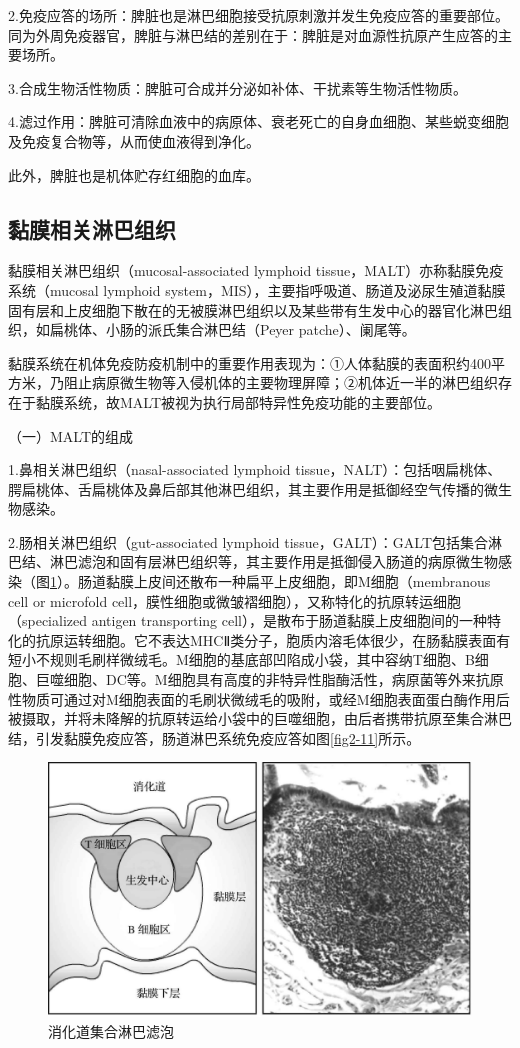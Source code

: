 2.免疫应答的场所：脾脏也是淋巴细胞接受抗原刺激并发生免疫应答的重要部位。同为外周免疫器官，脾脏与淋巴结的差别在于：脾脏是对血源性抗原产生应答的主要场所。

3.合成生物活性物质：脾脏可合成并分泌如补体、干扰素等生物活性物质。

4.滤过作用：脾脏可清除血液中的病原体、衰老死亡的自身血细胞、某些蜕变细胞及免疫复合物等，从而使血液得到净化。

此外，脾脏也是机体贮存红细胞的血库。


\subsection{黏膜相关淋巴组织}

黏膜相关淋巴组织（mucosal-associated lymphoid
tissue，MALT）亦称黏膜免疫系统（mucosal lymphoid
system，MIS），主要指呼吸道、肠道及泌尿生殖道黏膜固有层和上皮细胞下散在的无被膜淋巴组织以及某些带有生发中心的器官化淋巴组织，如扁桃体、小肠的派氏集合淋巴结（Peyer
patche）、阑尾等。

黏膜系统在机体免疫防疫机制中的重要作用表现为：①人体黏膜的表面积约400平方米，乃阻止病原微生物等入侵机体的主要物理屏障；②机体近一半的淋巴组织存在于黏膜系统，故MALT被视为执行局部特异性免疫功能的主要部位。

（一）MALT的组成

1.鼻相关淋巴组织（nasal-associated lymphoid
tissue，NALT）：包括咽扁桃体、腭扁桃体、舌扁桃体及鼻后部其他淋巴组织，其主要作用是抵御经空气传播的微生物感染。

2.肠相关淋巴组织（gut-associated lymphoid
tissue，GALT）：GALT包括集合淋巴结、淋巴滤泡和固有层淋巴组织等，其主要作用是抵御侵入肠道的病原微生物感染（图\ref{fig2-10}）。肠道黏膜上皮间还散布一种扁平上皮细胞，即M细胞（membranous
cell or microfold
cell，膜性细胞或微皱褶细胞），又称特化的抗原转运细胞（specialized
antigen transporting
cell），是散布于肠道黏膜上皮细胞间的一种特化的抗原运转细胞。它不表达MHCⅡ类分子，胞质内溶毛体很少，在肠黏膜表面有短小不规则毛刷样微绒毛。M细胞的基底部凹陷成小袋，其中容纳T细胞、B细胞、巨噬细胞、DC等。M细胞具有高度的非特异性脂酶活性，病原菌等外来抗原性物质可通过对M细胞表面的毛刷状微绒毛的吸附，或经M细胞表面蛋白酶作用后被摄取，并将未降解的抗原转运给小袋中的巨噬细胞，由后者携带抗原至集合淋巴结，引发黏膜免疫应答，肠道淋巴系统免疫应答如图\ref{fig2-11}所示。

\begin{figure}[!htbp]
 \centering
 \includegraphics[width=.5\textwidth]{./images/Image00035.jpg}
 \caption{消化道集合淋巴滤泡}
 \label{fig2-10}
  \end{figure} 

